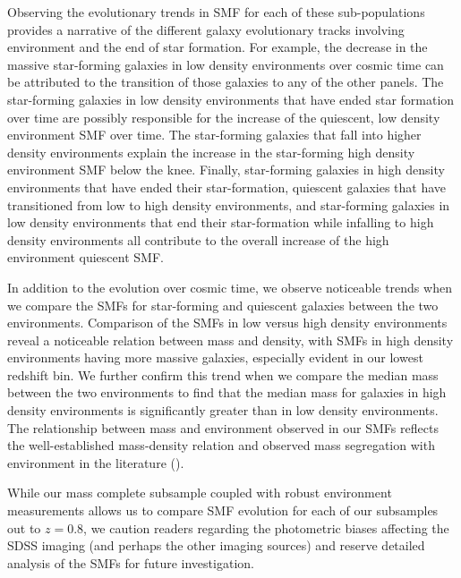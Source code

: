 \documentclass{emulateapj}
\begin{document}
Observing the evolutionary trends in SMF for each of these
sub-populations provides a narrative of the different galaxy
evolutionary tracks involving environment and the end of star
formation. For example, the decrease in the massive star-forming
galaxies in low density environments over cosmic time can be
attributed to the transition of those galaxies to any of the other
panels. The star-forming galaxies in low density environments that
have ended star formation over time are possibly responsible
for the increase of the quiescent, low density environment SMF over
time. The star-forming galaxies that fall into higher density
environments explain the increase in the star-forming high density
environment SMF below the knee. Finally, star-forming galaxies in high
density environments that have ended their star-formation,
quiescent galaxies that have transitioned from low to high density
environments, and star-forming galaxies in low density environments
that end their star-formation while infalling to high density
environments all contribute to the overall increase of the high
environment quiescent SMF.

In addition to the evolution over cosmic time, we observe noticeable
trends when we compare the SMFs for star-forming and quiescent
galaxies between the two environments. Comparison of the SMFs in low
versus high density environments reveal a noticeable relation between
mass and density, with SMFs in high density environments having more
massive galaxies, especially evident in our lowest redshift bin. 
We further confirm this trend when we compare the
median mass between the two environments to find that the median mass
for galaxies in high density environments is significantly greater
than in low density environments. The relationship between mass and
environment observed in our SMFs reflects the well-established
mass-density relation and observed mass segregation with environment
in the literature (\citealt{norberg02a, zehavi02a, Blanton:2005ab,
  bundy06a, Scodeggio:2009aa, Bolzonella:2010aa}).

While our mass complete subsample coupled with robust environment
measurements allows us to compare SMF evolution for each of our
subsamples out to $z=0.8$, we caution readers regarding the
photometric biases affecting the SDSS imaging (and perhaps the other
imaging sources) and reserve detailed analysis of the SMFs for 
future investigation.

\end{document}
